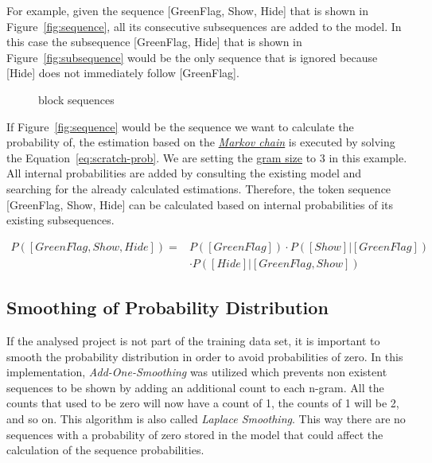 For example, given the sequence [GreenFlag, Show, Hide] that is shown in Figure~\ref{fig:sequence}, all its consecutive subsequences are added to the model. In this case the subsequence [GreenFlag, Hide] that is shown in Figure~\ref{fig:subsequence} would be the only sequence that is ignored because [Hide] does not immediately follow [GreenFlag]. 

\begin{figure}%
    \centering
    \qquad
    \caption[\scratch{} block sequences]{\label{fig:sequences}\scratch{} block sequences}%
\end{figure}

If Figure~\ref{fig:sequence} would be the sequence we want to calculate the probability of, the estimation based on the \hyperref[def:markov_chain]{\textit{Markov chain}} is executed by solving the Equation~\ref{eq:scratch-prob}. We are setting the \hyperref[def:gram size]{gram size} to 3 in this example. All internal probabilities are added by consulting the existing model and searching for the already calculated estimations. Therefore, the token sequence [GreenFlag, Show, Hide] can be calculated based on internal probabilities of its existing subsequences.

\begin{equation} \label{eq:scratch-prob}
\begin{aligned}
P([GreenFlag, Show, Hide]) ={} & P([GreenFlag])\cdot P([Show]|[GreenFlag]) \\
							  & \cdot P([Hide]|[GreenFlag, Show])
\end{aligned}
\end{equation}


\subsection{Smoothing of Probability Distribution}\label{subsec:smoothing}
If the analysed project is not part of the training data set, it is important to smooth the probability distribution in order to avoid probabilities of zero. In this implementation, \textit{Add-One-Smoothing} was utilized which prevents non existent sequences to be shown by adding an additional count to each n-gram. All the counts that used to be zero will now have a count of 1, the counts of 1 will be 2, and so on. This algorithm is also called \textit{Laplace Smoothing}. This way there are no sequences with a probability of zero stored in the model that could affect the calculation of the sequence probabilities.

